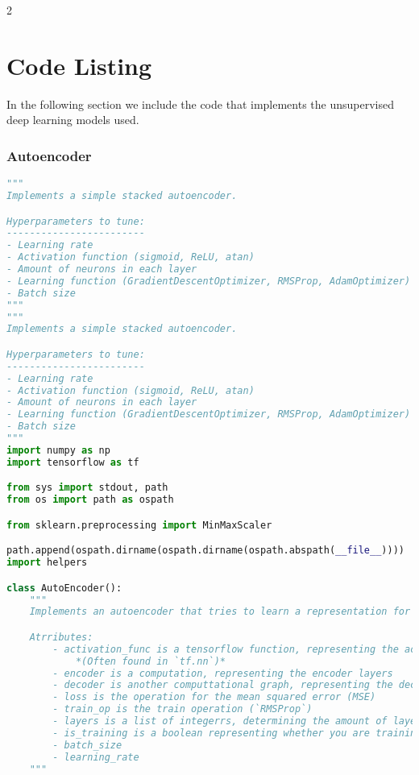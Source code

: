 \begin{landscape}
\begin{multicols}{2}
\chapter{Code Listing}

In the following section we include the code that implements the unsupervised deep learning models used.

\begingroup


\renewcommand{\thesubsection}{\arabic{subsection}}

\renewcommand{\addcontentsline}[3]{}%

\subsection{Autoencoder}

\begin{lstlisting}[language=Python]
"""
Implements a simple stacked autoencoder.

Hyperparameters to tune:
------------------------
- Learning rate
- Activation function (sigmoid, ReLU, atan)
- Amount of neurons in each layer
- Learning function (GradientDescentOptimizer, RMSProp, AdamOptimizer)
- Batch size
"""
"""
Implements a simple stacked autoencoder.

Hyperparameters to tune:
------------------------
- Learning rate
- Activation function (sigmoid, ReLU, atan)
- Amount of neurons in each layer
- Learning function (GradientDescentOptimizer, RMSProp, AdamOptimizer)
- Batch size
"""
import numpy as np
import tensorflow as tf

from sys import stdout, path
from os import path as ospath

from sklearn.preprocessing import MinMaxScaler

path.append(ospath.dirname(ospath.dirname(ospath.abspath(__file__))))
import helpers

class AutoEncoder():
    """
    Implements an autoencoder that tries to learn a representation for web page traces.

    Atrributes:
        - activation_func is a tensorflow function, representing the activation function used.
            *(Often found in `tf.nn`)*
        - encoder is a computation, representing the encoder layers
        - decoder is another computtational graph, representing the decoder layers
        - loss is the operation for the mean squared error (MSE)
        - train_op is the train operation (`RMSProp`)
        - layers is a list of integerrs, determining the amount of layers and their size
        - is_training is a boolean representing whether you are training the autoencoder or not *(used in the batch_norm layer)*.
        - batch_size
        - learning_rate
    """


\end{lstlisting}
\end{multicols}
\end{landscape}
